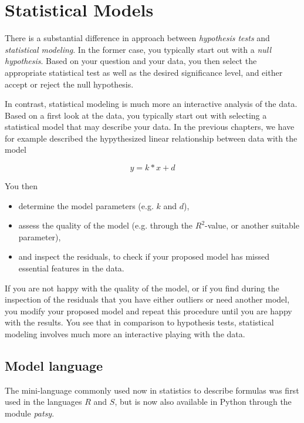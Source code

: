 \chapter{ Statistical Models }\label{chapter:Models}

There is a substantial difference in approach between \emph{hypothesis tests} and \emph{statistical modeling}. In the former case, you typically start out with a \emph{null hypothesis}. Based on your question and your data, you then select the appropriate statistical test as well as the desired significance level, and either accept or reject the null hypothesis.

In contrast, statistical modeling is much more an interactive analysis of the data. Based on a first look at the data, you typically start out with selecting a statistical model that may describe your data. In the previous chapters, we have for example described the hypythesized linear relationship between data with the model 

\begin{equation*}
  y = k*x + d
\end{equation*}

You then 
\begin{itemize}
  \item determine the model parameters (e.g. $k$ and $d$),
  \item assess the quality of the model (e.g. through the $R^2$-value, or another suitable parameter),
  \item and inspect the residuals, to check if your proposed model has missed essential features in the data.
\end{itemize}

If you are not happy with the quality of the model, or if you find during the inspection of the residuals that you have either outliers or need another model, you modify your proposed model and repeat this procedure until you are happy with the results. You see that in comparison to hypothesis tests, statistical modeling involves much more an interactive playing with the data.

\section{Model language}
The mini-language commonly used now in statistics to describe formulas was first used in the languages $R$ and $S$, but is now also available in Python through the module \emph{patsy}.


